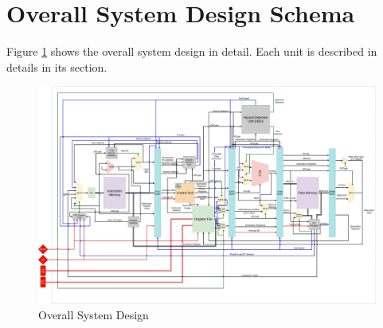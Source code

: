 \section{Overall System Design Schema}
Figure \ref{fig:overall} shows the overall system design in detail. Each unit is described in details in its section.
\begin{center}
    \begin{figure}[hp]
        \centering
        \includegraphics[width=\textwidth]{images/overall_system}
        \caption{Overall System Design}
        \label{fig:overall}
    \end{figure}
\end{center}


